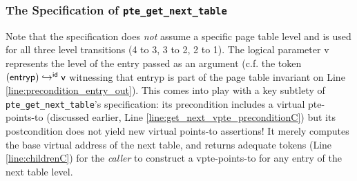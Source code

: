 \subsubsection{The Specification of \lstinline|pte_get_next_table|}
Note that the specification does \emph{not} assume a specific page table level and is used
for all three level transitions (4 to 3, 3 to 2, 2 to 1).
The logical parameter \textsf{v} represents the level
of the entry passed as an argument (c.f. the token $\ghostmaptoken{\textsf{id}}{(\mathsf{entryp})}{\textsf{v}}$ witnessing
that \textsf{entryp} is part of the page table invariant on Line \ref{line:precondition_entry_out}).
This comes into play with a key subtlety of \lstinline|pte_get_next_table|'s
specification: its precondition
includes a virtual {pte-points-to} (discussed earlier, Line \ref{line:get_next_vpte_preconditionC})
but its postcondition does not yield new virtual points-to assertions!
It merely computes the base virtual address of the next table, and returns adequate tokens
(Line \ref{line:childrenC})
for the \emph{caller} to construct a vpte-points-to for any entry of the next table level.

